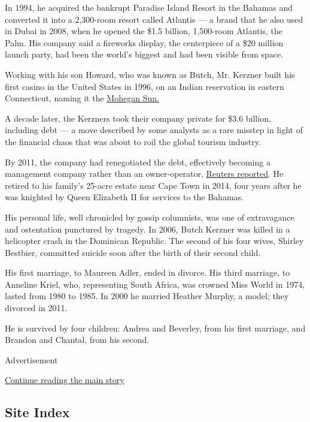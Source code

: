In 1994, he acquired the bankrupt Paradise Island Resort in the Bahamas
and converted it into a 2,300-room resort called Atlantis --- a brand
that he also used in Dubai in 2008, when he opened the \$1.5 billion,
1,500-room Atlantis, the Palm. His company said a fireworks display, the
centerpiece of a \$20 million launch party, had been the world's biggest
and had been visible from space.

Working with his son Howard, who was known as Butch, Mr. Kerzner built
his first casino in the United States in 1996, on an Indian reservation
in eastern Connecticut, naming it the
\href{https://mohegansun.com/}{Mohegan Sun.}

A decade later, the Kerzners took their company private for \$3.6
billion, including debt --- a move described by some analysts as a rare
misstep in light of the financial chaos that was about to roil the
global tourism industry.

By 2011, the company had renegotiated the debt, effectively becoming a
management company rather than an owner-operator,
\href{https://www.reuters.com/article/kerzner-bahamas/update-1-kerzner-transfers-atlantis-resort-to-brookfield-idUSN1E7AS18S20111129}{Reuters
reported}. He retired to his family's 25-acre estate near Cape Town in
2014, four years after he was knighted by Queen Elizabeth II for
services to the Bahamas.

His personal life, well chronicled by gossip columnists, was one of
extravagance and ostentation punctured by tragedy. In 2006, Butch
Kerzner was killed in a helicopter crash in the Dominican Republic. The
second of his four wives, Shirley Bestbier, committed suicide soon after
the birth of their second child.

His first marriage, to Maureen Adler, ended in divorce. His third
marriage, to Anneline Kriel, who, representing South Africa, was crowned
Miss World in 1974, lasted from 1980 to 1985. In 2000 he married Heather
Murphy, a model; they divorced in 2011.

He is survived by four children: Andrea and Beverley, from his first
marriage, and Brandon and Chantal, from his second.

Advertisement

\protect\hyperlink{after-bottom}{Continue reading the main story}

\hypertarget{site-index}{%
\subsection{Site Index}\label{site-index}}

